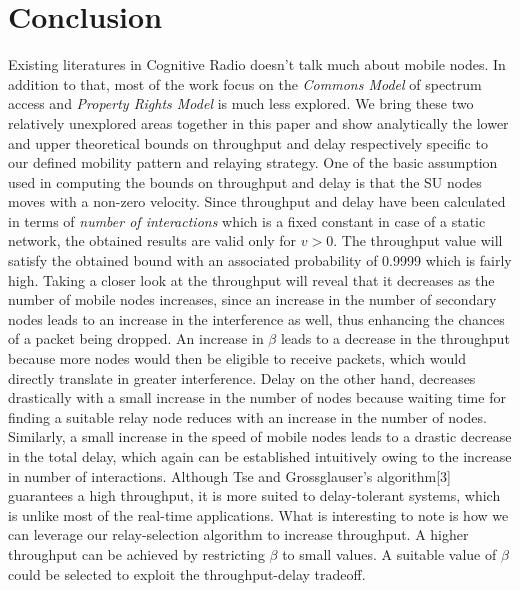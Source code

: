 \documentclass[conference]{IEEEtran}
\begin{document}
\section{Conclusion}
Existing literatures in Cognitive Radio doesn't talk much about mobile nodes. In addition to that, most of the work focus on the \textit{Commons Model} of spectrum access and 
\textit{Property Rights Model} is much less explored. We bring these two relatively unexplored areas together in this paper and show analytically the lower and upper theoretical 
bounds on throughput and delay respectively specific to our defined mobility pattern and relaying strategy. One of the basic assumption used in computing the bounds on throughput 
and delay is that the SU nodes moves with a non-zero velocity. 
Since throughput and delay have been calculated in terms of \textit{number of interactions} which is a fixed constant in case of a static network, the obtained results are valid 
only for $v>0$. The throughput value will satisfy the obtained bound with an associated probability of 0.9999 which is fairly high. Taking a closer look at the throughput will 
reveal that it decreases as the number of mobile nodes increases, since an increase in the number of secondary nodes leads to an 
increase in the interference as well, thus enhancing the chances of a packet being dropped. An increase in $\beta$ leads to a decrease in the throughput because more nodes 
would then be eligible to receive packets, which would directly translate in greater interference. Delay on the other hand, decreases drastically with a small increase in the 
number of nodes because waiting time for finding a suitable relay node reduces with an increase in the number of nodes. Similarly, a small 
increase in the speed of mobile nodes leads to a drastic decrease in the total delay, which again can be established intuitively owing to the increase in number of interactions. 
Although Tse and Grossglauser's algorithm[3] guarantees a high throughput, it is more suited to delay-tolerant systems, which is unlike most of the real-time applications.
What is interesting to note is how we can leverage our relay-selection algorithm to increase throughput. A higher throughput can be achieved by 
restricting $\beta$ to small values. A suitable value of $\beta$ could be selected to exploit the throughput-delay tradeoff.
\end{document}
